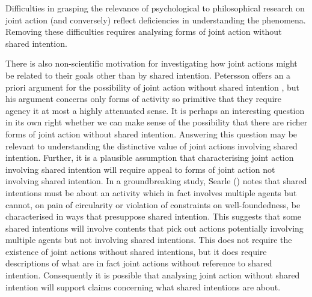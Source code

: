 \documentclass[12pt,a4paper]{extarticle}
\begin{document}
Difficulties in grasping the relevance of psychological to philosophical research on joint action (and conversely) reflect deficiencies in understanding the phenomena.
Removing these difficulties requires analysing forms of joint action without shared intention.

There is also non-scientific motivation for investigating how joint actions might be related to their goals other than by shared intention.  
Petersson offers an a priori argument for the possibility of joint action without shared intention \citep{petersson_collectivity_2007}, but his argument concerns only forms of activity so primitive that they require agency it at most a highly attenuated sense.
It is perhaps an interesting question in its own right whether we can make sense of the possibility that there are richer forms of joint action without shared intention.
Answering this question may be relevant to understanding the distinctive value of joint actions involving shared intention.
Further, it is a plausible assumption that characterising joint action involving shared intention will require appeal to forms of joint action not involving shared intention.
In a groundbreaking study, Searle (\citeyear{Searle:1990em}) notes that shared intentions must be about an activity which in fact involves multiple agents but cannot, on pain of circularity or violation of constraints on well-foundedness, be characterised in ways that presuppose shared intention.
This suggests that some shared intentions will involve contents that pick out actions potentially involving multiple agents but not involving shared intentions.
This does not require the existence of joint actions without shared intentions, but it does require descriptions of what are in fact joint actions without reference to shared intention.
Consequently it is possible that analysing joint action without shared intention will support claims concerning what shared intentions are about.
\end{document}
